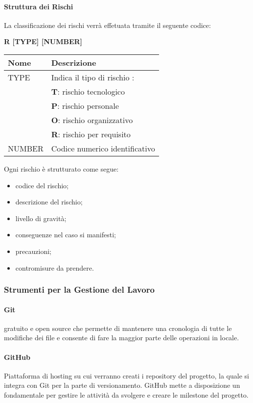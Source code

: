 \paragraph{Struttura dei Rischi} \hfill \break
La classificazione dei rischi verrà effetuata tramite il seguente codice:
\begin{center}
    \textbf{R [TYPE] [NUMBER]}
\end{center}
\begin{center}
    \renewcommand{\arraystretch}{1.8} %
    \begin{tabular}{ |m{7em}|m{30em}| }
        \hline
        \textbf{Nome} & \textbf{Descrizione} \\
        \hline
        TYPE & Indica il tipo di rischio :\\
             & \textbf{T}: rischio tecnologico\\
             & \textbf{P}: rischio personale\\
             & \textbf{O}: rischio organizzativo\\
             & \textbf{R}: rischio per requisito\\
        \hline
        NUMBER & Codice numerico identificativo\\
        \hline
    \end{tabular}
\end{center}
Ogni rischio è strutturato come segue:
\begin{itemize}
    \item codice del rischio;
    \item descrizione del rischio;
    \item livello di gravità;
    \item conseguenze nel caso si manifesti;
    \item precauzioni;
    \item contromisure da prendere.
\end{itemize}

\subsubsection{Strumenti per la Gestione del Lavoro}
\paragraph{Git} \hfill \break
{} gratuito e open source che permette di mantenere una cronologia di tutte le 
modifiche dei file e consente di fare la maggior parte delle operazioni in locale.

\paragraph{GitHub} \hfill \break
Piattaforma di hosting su cui verranno creati i repository del progetto, la quale si integra con Git per la 
parte di versionamento. GitHub mette a disposizione un  fondamentale per 
gestire le attività da svolgere e creare le milestone del progetto.